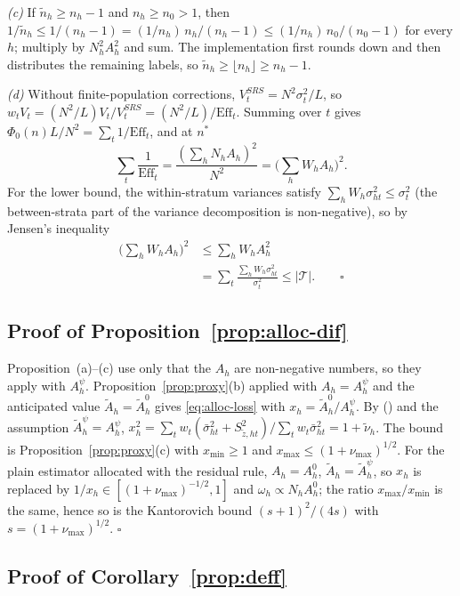 \emph{(c)} If $\tilde n_h\ge n_h-1$ and $n_h\ge n_0>1$, then
$1/\tilde n_h\le1/(n_h-1)=(1/n_h)\,n_h/(n_h-1)\le(1/n_h)\,n_0/(n_0-1)$ for every $h$; multiply by
$N_h^2A_h^2$ and sum. The implementation first rounds down and then distributes the remaining
labels, so $\tilde n_h\ge\lfloor n_h\rfloor\ge n_h-1$.

\emph{(d)} Without finite-population corrections, $V^{SRS}_t=N^2\sigma^2_t/L$, so
$w_tV_t=(N^2/L)V_t/V^{SRS}_t=(N^2/L)/\mathrm{Eff}_t$. Summing over $t$ gives
$\Phi_0(n)L/N^2=\sum_t1/\mathrm{Eff}_t$, and at $n^\ast$
\[
\sum_t\frac{1}{\mathrm{Eff}_t}=\frac{(\sum_hN_hA_h)^2}{N^2}=\Big(\sum_hW_hA_h\Big)^2 .
\] For the lower bound, the
within-stratum variances satisfy $\sum_hW_h\sigma^2_{ht}\le\sigma^2_t$ (the between-strata part of
the variance decomposition is non-negative), so by Jensen's inequality
\begin{align*}
\Big(\sum_hW_hA_h\Big)^2&\le\sum_hW_hA_h^2\\
&=\sum_t\frac{\sum_hW_h\sigma^2_{ht}}{\sigma^2_t}\le|\mathcal T| .\qquad\square
\end{align*}

\subsection{Proof of Proposition~\ref{prop:alloc-dif}}

Proposition~(a)--(c) use only that the $A_h$ are non-negative numbers, so they apply with $A^\psi_h$. Proposition~\ref{prop:proxy}(b) applied with $A_h=A^\psi_h$ and the anticipated
value $\tilde A_h=\tilde A^0_h$ gives \eqref{eq:alloc-loss} with $x_h=\tilde A^0_h/A^\psi_h$. By () and the assumption $\tilde A^\psi_h=A^\psi_h$,
$x_h^2=\sum_tw_t(\bar\sigma^2_{ht}+S^2_{\tilde z,ht})/\sum_tw_t\bar\sigma^2_{ht}=1+\tilde\nu_h$. The bound is Proposition~\ref{prop:proxy}(c) with $x_{\min}\ge1$ and $x_{\max}\le(1+\nu_{\max})^{1/2}$.
For the plain estimator allocated with the residual rule, $A_h=A^0_h$, $\tilde A_h=\tilde A^\psi_h$, so $x_h$ is replaced by $1/x_h\in[(1+\nu_{\max})^{-1/2},1]$ and
$\omega_h\propto N_hA^0_h$; the ratio $x_{\max}/x_{\min}$ is the same, hence so is the Kantorovich bound $(s+1)^2/(4s)$ with $s=(1+\nu_{\max})^{1/2}$. $\square$

\subsection{Proof of Corollary~\ref{prop:deff}}

